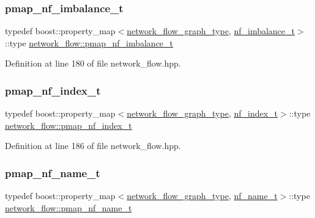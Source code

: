 \subsubsection{\texorpdfstring{pmap\+\_\+nf\+\_\+imbalance\+\_\+t}{pmap\_nf\_imbalance\_t}}
{\footnotesize\ttfamily typedef boost\+::property\+\_\+map$<$\hyperlink{classnetwork__flow_abfdb8d1baba183c2b121f8c078b9b640}{network\+\_\+flow\+\_\+graph\+\_\+type}, \hyperlink{structnetwork__flow_1_1nf__imbalance__t}{nf\+\_\+imbalance\+\_\+t}$>$\+::type \hyperlink{classnetwork__flow_a5760a4393bb7caf9af993443e209de05}{network\+\_\+flow\+::pmap\+\_\+nf\+\_\+imbalance\+\_\+t}\hspace{0.3cm}{\ttfamily [private]}}



Definition at line 180 of file network\+\_\+flow.\+hpp.

\mbox{\label{classnetwork__flow_a8f87f8e2ed2e6d081d66eba9ea1b284c}} 
\subsubsection{\texorpdfstring{pmap\+\_\+nf\+\_\+index\+\_\+t}{pmap\_nf\_index\_t}}
{\footnotesize\ttfamily typedef boost\+::property\+\_\+map$<$\hyperlink{classnetwork__flow_abfdb8d1baba183c2b121f8c078b9b640}{network\+\_\+flow\+\_\+graph\+\_\+type}, \hyperlink{structnetwork__flow_1_1nf__index__t}{nf\+\_\+index\+\_\+t}$>$\+::type \hyperlink{classnetwork__flow_a8f87f8e2ed2e6d081d66eba9ea1b284c}{network\+\_\+flow\+::pmap\+\_\+nf\+\_\+index\+\_\+t}\hspace{0.3cm}{\ttfamily [private]}}



Definition at line 186 of file network\+\_\+flow.\+hpp.

\mbox{\label{classnetwork__flow_a86d192070fc0f9d58337b45c30855c6f}} 
\subsubsection{\texorpdfstring{pmap\+\_\+nf\+\_\+name\+\_\+t}{pmap\_nf\_name\_t}}
{\footnotesize\ttfamily typedef boost\+::property\+\_\+map$<$\hyperlink{classnetwork__flow_abfdb8d1baba183c2b121f8c078b9b640}{network\+\_\+flow\+\_\+graph\+\_\+type}, \hyperlink{structnetwork__flow_1_1nf__name__t}{nf\+\_\+name\+\_\+t}$>$\+::type \hyperlink{classnetwork__flow_a86d192070fc0f9d58337b45c30855c6f}{network\+\_\+flow\+::pmap\+\_\+nf\+\_\+name\+\_\+t}\hspace{0.3cm}{\ttfamily [private]}}



